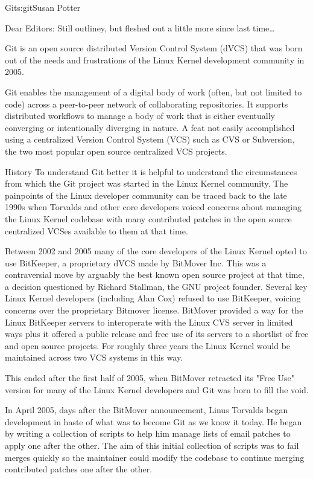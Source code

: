 \begin{aosachapter}{Git}{s:git}{Susan Potter}

Dear Editors: Still outliney, but fleshed out a little more since last time\ldots

Git is an open source distributed Version Control System (dVCS) that was 
born out of the needs and frustrations of the Linux Kernel development
community in 2005.

Git enables the management of a digital body of work (often, 
but not limited to code) across a peer-to-peer network of 
collaborating repositories. It supports distributed workflows to 
manage a body of work that is either eventually converging or 
intentionally diverging in nature. A feat not easily accomplished
using a centralized Version Control System (VCS) such as CVS or
Subversion, the two most popular open source centralized VCS 
projects.

\begin{aosasect1}{History}
To understand Git better it is helpful to understand the circumstances
from which the Git project was started in the Linux Kernel community.
The painpoints of the Linux developer community can be traced back to the 
late 1990s when Torvalds and other core developers voiced concerns 
about managing the Linux Kernel codebase with many contributed patches
in the open source centralized VCSes available to them at that time.

Between 2002 and 2005 many of the core developers of the Linux 
Kernel opted to use BitKeeper, a proprietary dVCS made by BitMover Inc.
This was a contraversial move by arguably the best known open source 
project at that time, a decision questioned by Richard Stallman, the GNU 
project founder. Several key Linux Kernel developers (including Alan Cox) 
refused to use BitKeeper, voicing concerns over the proprietary Bitmover 
license. BitMover provided a way for the Linux BitKeeper servers to 
interoperate with the Linux CVS server in limited ways plus it offered a 
public release and free use of its servers to a shortlist of free and 
open source projects. For roughly three years the Linux Kernel would be 
maintained across two VCS systems in this way.

This ended after the first half of 2005, when BitMover retracted its 
"Free Use" version for many of the Linux Kernel developers and Git was born
to fill the void.

In April 2005, days after the BitMover announcement, Linus Torvalds began
development in haste of what was to become Git as we know it today. He began 
by writing a collection of scripts to help him manage lists of email patches
to apply one after the other. The aim of this initial collection of scripts 
was to fail merges quickly so the maintainer could modify the codebase to 
continue merging contributed patches one after the other.


\end{aosasect1}
\end{aosachapter}
